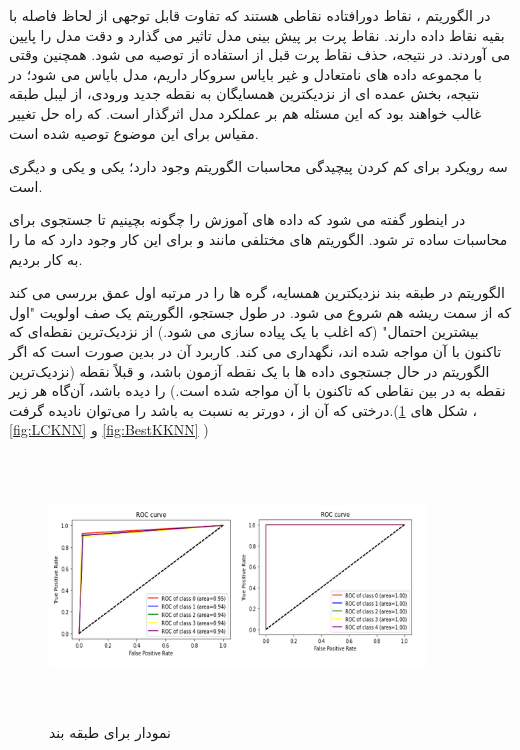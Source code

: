 \documentclass[12pt,onecolumn,a4paper]{article}
\begin{document}
در الگوریتم ، نقاط دورافتاده نقاطی هستند که تفاوت قابل توجهی از لحاظ فاصله با بقیه نقاط داده دارند. نقاط پرت بر پیش بینی مدل تاثیر می گذارد و دقت مدل را پایین می آوردند. در نتیجه، حذف نقاط پرت قبل از استفاده از  توصیه می شود. همچنین وقتی با مجموعه داده های نامتعادل و غیر بایاس سروکار داریم، مدل بایاس می شود؛ در نتیجه، بخش عمده ای از نزدیکترین همسایگان به نقطه جدید ورودی، از لیبل طبقه غالب خواهند بود که این مسئله هم بر عملکرد مدل اثرگذار است. که راه حل تغییر مقیاس برای این موضوع توصیه شده است.

سه رویکرد برای کم کردن پیچیدگی محاسبات الگوریتم  وجود دارد؛ یکی  و یکی  و دیگری  است.

در  اینطور گفته می شود که داده های آموزش را چگونه بچینیم تا جستجوی برای محاسبات  ساده تر شود. الگوریتم های مختلفی مانند  و  برای این کار وجود دارد که ما  را به کار بردیم. 

الگوریتم  در طبقه بند نزدیکترین همسایه، گره ها را در مرتبه اول عمق بررسی می کند که از سمت ریشه هم شروع می شود. در طول جستجو، الگوریتم یک صف اولویت  "اول بیشترین احتمال" (که اغلب با یک  پیاده سازی می شود.) از  نزدیک‌ترین نقطه‌ای که تاکنون با آن مواجه شده‌ اند، نگهداری می کند. کاربرد آن در  بدین صورت است که اگر الگوریتم در حال جستجوی داده ها با یک نقطه آزمون  باشد، و قبلاً نقطه‌ (نزدیک‌ترین نقطه به  در بین نقاطی که تاکنون با آن مواجه شده‌ است.) را دیده باشد، آن‌گاه هر زیر درختی که  آن از ، دورتر به نسبت به  باشد را می‌توان نادیده گرفت.(شکل های \ref{fig:ROCKNN} ، \ref{fig:LCKNN} و \ref{fig:BestKKNN} )

\begin{figure}
  \centering
  \includegraphics[width=10cm,height=7cm,keepaspectratio]{9.png}
  \caption{نمودار  برای طبقه بند }
  \label{fig:ROCKNN}
\end{figure}
\end{document}
